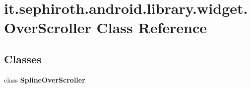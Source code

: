 \hypertarget{classit_1_1sephiroth_1_1android_1_1library_1_1widget_1_1_over_scroller}{}\section{it.\+sephiroth.\+android.\+library.\+widget.\+Over\+Scroller Class Reference}
\label{classit_1_1sephiroth_1_1android_1_1library_1_1widget_1_1_over_scroller}
\subsection*{Classes}
\begin{DoxyCompactItemize}
\item 
class {\bfseries Spline\+Over\+Scroller}
\end{DoxyCompactItemize}
